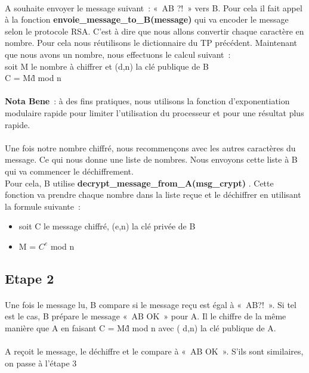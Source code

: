 \documentclass[11pt,fleqn]{book} %
\begin{document}
\paragraph{}A souhaite envoyer le message suivant : « AB ?! » vers B. Pour cela il fait appel à la fonction \textbf{envoie\_message\_to\_B(message)} qui va encoder le message selon le protocole RSA. C'est à dire que nous allons convertir chaque caractère en nombre. Pour cela nous réutilisons le dictionnaire du TP précédent. Maintenant que nous avons un nombre, nous effectuons le calcul suivant : 
\\soit M le nombre à chiffrer et (d,n) la clé publique de B
\\C = M\^d mod n
\\\\\textbf{Nota Bene} : à des fins pratiques, nous utilisons la fonction d'exponentiation modulaire rapide pour limiter l'utilisation du processeur et pour une résultat plus rapide.
\\\\Une fois notre nombre chiffré, nous recommençons avec les autres caractères du message. Ce qui nous donne une liste de nombres. Nous envoyons cette liste à B qui va commencer le déchiffrement.
\\Pour cela, B utilise \textbf{decrypt\_message\_from\_A(msg\_crypt)} . Cette fonction va prendre chaque nombre dans la liste reçue et le déchiffrer en utilisant la formule suivante : 
\begin{itemize}
 \item soit C le message chiffré, (e,n) la clé privée de B
 \item M = $C^e$ mod n
\end{itemize}

\subsection{Etape 2}
\paragraph{}Une fois le message lu, B compare si le message reçu est égal à « AB?! ». Si tel est le cas, B prépare le message « AB OK » pour A. Il le chiffre de la même manière que A en faisant C = M\^d mod n avec ( d,n) la clé publique de A.
\\\\A reçoit le message, le déchiffre et le compare à « AB OK ». S'ils sont similaires, on passe à l'étape 3
\end{document}
